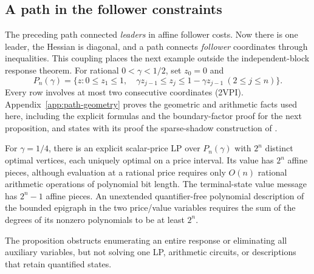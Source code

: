 \subsection{A path in the follower constraints}
\label{subsec:follower-path}
The preceding path connected \emph{leaders} in affine follower costs. Now there
is one leader, the Hessian is diagonal, and a path connects \emph{follower}
coordinates through inequalities. This coupling places the next example
outside the independent-block response theorem.
For rational \(0<\gamma<1/2\), set \(z_0=0\) and
\begin{equation}\label{eq:klee-polytope}
 P_n(\gamma)=\{z:0\le z_1\le1,\quad
          \gamma z_{j-1}\le z_j\le1-\gamma z_{j-1}\ (2\le j\le n)\}.
\end{equation}
Every row involves at most two consecutive coordinates (2VPI).
Appendix~\ref{app:path-geometry} proves the geometric and arithmetic facts
used here, including the explicit formulas and the boundary-factor proof for
the next proposition, and states with its proof the sparse-shadow construction
of \citet[Section~4]{GartnerEtAl2013}.

\begin{proposition}\label{prop:path-shadow-boundary}
For \(\gamma=1/4\), there is an explicit scalar-price LP over \(P_n(\gamma)\)
with \(2^n\) distinct optimal vertices, each uniquely optimal on a price
interval. Its value has \(2^n\) affine pieces, although evaluation at a
rational price requires only \(O(n)\) rational arithmetic operations of
polynomial bit length. The terminal-state value message has \(2^n-1\) affine
pieces. An unextended quantifier-free polynomial description of the bounded
epigraph in the two price/value variables requires the sum of the degrees of
its nonzero polynomials to be at least \(2^n\).
\end{proposition}
The proposition obstructs enumerating an entire response or eliminating all
auxiliary variables, but not solving one LP, arithmetic circuits, or
descriptions that retain quantified states.

